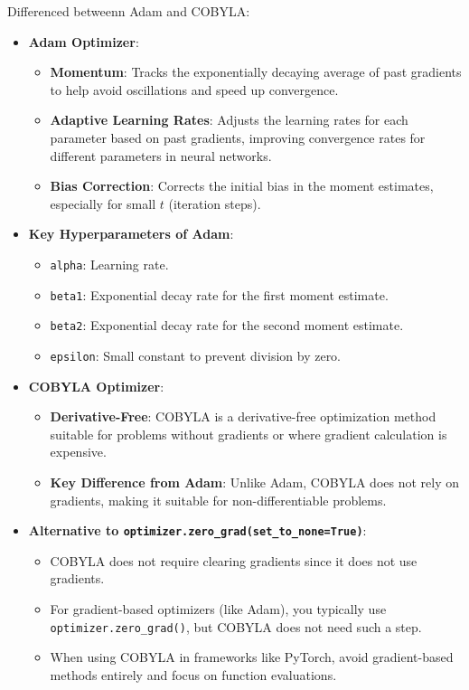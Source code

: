 \documentclass[conference]{IEEEtran}
\begin{document}
\begin{itemize}
    Differenced betweenn Adam and COBYLA:
    \begin{itemize}
        \item \textbf{Adam Optimizer}:
        \begin{itemize}
            \item \textbf{Momentum}: Tracks the exponentially decaying average of past gradients to help avoid oscillations and speed up convergence.
            \item \textbf{Adaptive Learning Rates}: Adjusts the learning rates for each parameter based on past gradients, improving convergence rates for different parameters in neural networks.
            \item \textbf{Bias Correction}: Corrects the initial bias in the moment estimates, especially for small $t$ (iteration steps).
        \end{itemize}
    
        \item \textbf{Key Hyperparameters of Adam}:
        \begin{itemize}
            \item \texttt{alpha}: Learning rate.
            \item \texttt{beta1}: Exponential decay rate for the first moment estimate.
            \item \texttt{beta2}: Exponential decay rate for the second moment estimate.
            \item \texttt{epsilon}: Small constant to prevent division by zero.
        \end{itemize}
        
        \item \textbf{COBYLA Optimizer}:
        \begin{itemize}
            \item \textbf{Derivative-Free}: COBYLA is a derivative-free optimization method suitable for problems without gradients or where gradient calculation is expensive.
            \item \textbf{Key Difference from Adam}: Unlike Adam, COBYLA does not rely on gradients, making it suitable for non-differentiable problems.
        \end{itemize}
        
        \item \textbf{Alternative to \texttt{optimizer.zero\_grad(set\_to\_none=True)}}:
        \begin{itemize}
            \item COBYLA does not require clearing gradients since it does not use gradients.
            \item For gradient-based optimizers (like Adam), you typically use \texttt{optimizer.zero\_grad()}, but COBYLA does not need such a step.
            \item When using COBYLA in frameworks like PyTorch, avoid gradient-based methods entirely and focus on function evaluations.
        \end{itemize}
    \end{itemize}



\end{itemize}
\end{document}
